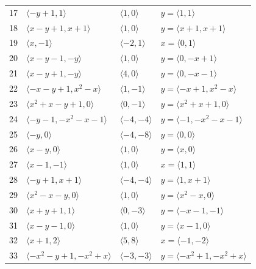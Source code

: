 \documentclass[11pt]{article}
\begin{document}
\begin{longtable}{@{}rlll@{}}
17 & $\langle -y+1,1\rangle$ & $\langle 1,0\rangle$ & $y=\langle 1,1\rangle$\\
18 & $\langle x-y+1,x+1\rangle$ & $\langle 1,0\rangle$ & $y=\langle x+1,x+1\rangle$\\
19 & $\langle x,-1\rangle$ & $\langle -2,1\rangle$ & $x=\langle 0,1\rangle$\\
20 & $\langle x-y-1,-y\rangle$ & $\langle 1,0\rangle$ & $y=\langle 0,-x+1\rangle$\\
21 & $\langle x-y+1,-y\rangle$ & $\langle 4,0\rangle$ & $y=\langle 0,-x-1\rangle$\\
22 & $\langle -x-y+1,x^{2}-x\rangle$ & $\langle 1,-1\rangle$ & $y=\langle -x+1,x^{2}-x\rangle$\\
23 & $\langle x^{2}+x-y+1,0\rangle$ & $\langle 0,-1\rangle$ & $y=\langle x^{2}+x+1,0\rangle$\\
24 & $\langle -y-1,-x^{2}-x-1\rangle$ & $\langle -4,-4\rangle$ & $y=\langle -1,-x^{2}-x-1\rangle$\\
25 & $\langle -y,0\rangle$ & $\langle -4,-8\rangle$ & $y=\langle 0,0\rangle$\\
26 & $\langle x-y,0\rangle$ & $\langle 1,0\rangle$ & $y=\langle x,0\rangle$\\
27 & $\langle x-1,-1\rangle$ & $\langle 1,0\rangle$ & $x=\langle 1,1\rangle$\\
28 & $\langle -y+1,x+1\rangle$ & $\langle -4,-4\rangle$ & $y=\langle 1,x+1\rangle$\\
29 & $\langle x^{2}-x-y,0\rangle$ & $\langle 1,0\rangle$ & $y=\langle x^{2}-x,0\rangle$\\
30 & $\langle x+y+1,1\rangle$ & $\langle 0,-3\rangle$ & $y=\langle -x-1,-1\rangle$\\
31 & $\langle x-y-1,0\rangle$ & $\langle 1,0\rangle$ & $y=\langle x-1,0\rangle$\\
32 & $\langle x+1,2\rangle$ & $\langle 5,8\rangle$ & $x=\langle -1,-2\rangle$\\
33 & $\langle -x^{2}-y+1,-x^{2}+x\rangle$ & $\langle -3,-3\rangle$ & $y=\langle -x^{2}+1,-x^{2}+x\rangle$\\
\end{longtable}
\endgroup
\end{document}
